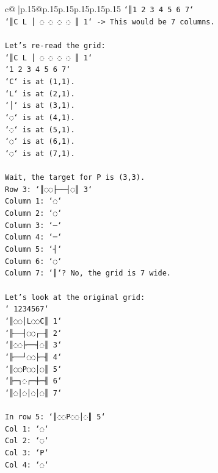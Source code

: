 \documentclass{article}
\begin{document}
{\begin{supertabular}{c@{$\;$}|p{.15\linewidth}@{}p{.15\linewidth}p{.15\linewidth}p{.15\linewidth}p{.15\linewidth}p{.15\linewidth}}
{{{\texttt{`║1 2 3 4 5 6 7`} \\
\texttt{`║C L │ ◌ ◌ ◌ ◌ ║ 1` {-}> This would be 7 columns.} \\
\\ 
\texttt{Let's re{-}read the grid:} \\
\texttt{`║C L │ ◌ ◌ ◌ ◌ ║ 1`} \\
\texttt{`1 2 3 4 5 6 7`} \\
\texttt{`C` is at (1,1).} \\
\texttt{`L` is at (2,1).} \\
\texttt{`│` is at (3,1).} \\
\texttt{`◌` is at (4,1).} \\
\texttt{`◌` is at (5,1).} \\
\texttt{`◌` is at (6,1).} \\
\texttt{`◌` is at (7,1).} \\
\\ 
\texttt{Wait, the target for P is (3,3).} \\
\texttt{Row 3: `║◌◌├──┤◌║ 3`} \\
\texttt{Column 1: `◌`} \\
\texttt{Column 2: `◌`} \\
\texttt{Column 3: `─`} \\
\texttt{Column 4: `─`} \\
\texttt{Column 5: `┤`} \\
\texttt{Column 6: `◌`} \\
\texttt{Column 7: `║`? No, the grid is 7 wide.} \\
\\ 
\texttt{Let's look at the original grid:} \\
\texttt{` 1234567`} \\
\texttt{`║◌◌│L◌◌C║ 1`} \\
\texttt{`╟──┤◌◌┌─╢ 2`} \\
\texttt{`║◌◌├──┤◌║ 3`} \\
\texttt{`╟──┘◌◌├─╢ 4`} \\
\texttt{`║◌◌P◌◌│◌║ 5`} \\
\texttt{`╟─┐◌┌─┼─╢ 6`} \\
\texttt{`║◌│◌│◌│◌║ 7`} \\
\\ 
\texttt{In row 5: `║◌◌P◌◌│◌║ 5`} \\
\texttt{Col 1: `◌`} \\
\texttt{Col 2: `◌`} \\
\texttt{Col 3: `P`} \\
\texttt{Col 4: `◌`} \\
}}}
\end{supertabular}}
\end{document}

